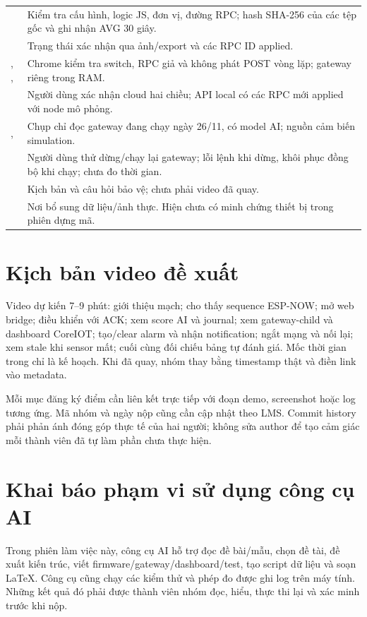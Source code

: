 \begin{longtable}{P{6.1cm}P{8.7cm}}
 & Kiểm tra cấu hình, logic JS, đơn vị, đường RPC; hash SHA-256 của các tệp gốc và ghi nhận AVG 30 giây. \\
 & Trạng thái xác nhận qua ảnh/export và các RPC ID applied. \\
, ,  & Chrome kiểm tra switch, RPC giả và không phát POST vòng lặp; gateway riêng trong RAM. \\
 & Người dùng xác nhận cloud hai chiều; API local có các RPC mới applied với node mô phỏng. \\
,  & Chụp chỉ đọc gateway đang chạy ngày 26/11, có model AI; nguồn cảm biến simulation. \\
 & Người dùng thử dừng/chạy lại gateway; lỗi lệnh khi dừng, khôi phục đồng bộ khi chạy; chưa đo thời gian. \\
 & Kịch bản và câu hỏi bảo vệ; chưa phải video đã quay. \\
 & Nơi bổ sung dữ liệu/ảnh thực. Hiện chưa có minh chứng thiết bị trong phiên dựng mã. \\
\bottomrule
\end{longtable}

\section{Kịch bản video đề xuất}
Video dự kiến 7--9 phút: giới thiệu mạch; cho thấy sequence ESP-NOW; mở web bridge; điều khiển với ACK; xem score AI và journal; xem gateway-child và dashboard CoreIOT; tạo/clear alarm và nhận notification; ngắt mạng và nối lại; xem stale khi sensor mất; cuối cùng đối chiếu bảng tự đánh giá. Mốc thời gian trong  chỉ là kế hoạch. Khi đã quay, nhóm thay bằng timestamp thật và điền link vào metadata.

Mỗi mục đăng ký điểm cần liên kết trực tiếp với đoạn demo, screenshot hoặc log tương ứng. Mã nhóm và ngày nộp cũng cần cập nhật theo LMS. Commit history phải phản ánh đóng góp thực tế của hai người; không sửa author để tạo cảm giác mỗi thành viên đã tự làm phần chưa thực hiện.

\section{Khai báo phạm vi sử dụng công cụ AI}
Trong phiên làm việc này, công cụ AI hỗ trợ đọc đề bài/mẫu, chọn đề tài, đề xuất kiến trúc, viết firmware/gateway/dashboard/test, tạo script dữ liệu và soạn LaTeX. Công cụ cũng chạy các kiểm thử và phép đo được ghi log trên máy tính. Những kết quả đó phải được thành viên nhóm đọc, hiểu, thực thi lại và xác minh trước khi nộp.

